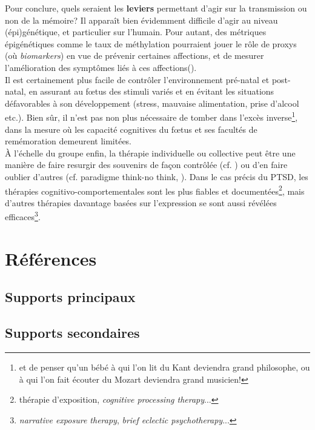 \documentclass[french]{article}
\begin{document}
			Pour conclure, quels seraient les \textbf{leviers} permettant d'agir sur la transmission ou non de la mémoire? Il apparaît bien évidemment difficile d'agir au niveau (épi)génétique, et particulier sur l'humain. Pour autant, des métriques épigénétiques comme le taux de méthylation pourraient jouer le rôle de proxys (où \textit{biomarkers}) en vue de prévenir certaines affections, et de mesurer l'amélioration des symptômes liés à ces affections(\cite{yehuda2013}).\\
			Il est certainement plus facile de contrôler l'environnement pré-natal et post-natal, en assurant au fœtus des stimuli variés et en évitant les situations défavorables à son développement (stress, mauvaise alimentation, prise d'alcool etc.). Bien sûr, il n'est pas non plus nécessaire de tomber dans l'excès inverse\footnote{et de penser qu'un bébé à qui l'on lit du Kant deviendra grand philosophe, ou à qui l'on fait écouter du Mozart deviendra grand musicien!}, dans la mesure où les capacité cognitives du fœtus et ses facultés de remémoration demeurent limitées.\\
			À l'échelle du groupe enfin, la thérapie individuelle ou collective peut être une manière de faire resurgir des souvenirs de façon contrôlée (cf. \cite{fossion2003}) ou d'en faire oublier d'autres (cf. paradigme think-no think, \cite{anderson2001}). Dans le cas précis du PTSD, les thérapies cognitivo-comportementales sont les plus fiables et documentées\footnote{thérapie d'exposition, \textit{cognitive processing therapy}...}, mais d'autres thérapies davantage basées sur l'expression se sont aussi révélées efficaces\footnote{\textit{narrative exposure therapy}, \textit{brief eclectic psychotherapy}...}.
			
	\newpage
	\section*{Références}
	\subsection*{Supports principaux}
	\printbibliography[heading=maingeno, keyword=main, keyword=geno]
	\printbibliography[heading=maindevelo, keyword=main, keyword=develo]
	\printbibliography[heading=mainsocio, keyword=main, keyword=socio]
	\subsection*{Supports secondaires}
	\printbibliography[heading=minorgeno, keyword=minor, keyword=geno]
	\printbibliography[heading=minordevelo, keyword=minor, keyword=develo]
	\printbibliography[heading=minorsocio, keyword=minor, keyword=socio]
	\printbibliography[heading=minorpsycho, keyword=minor, keyword=psycho]
	\nocite{*}
\end{document}
